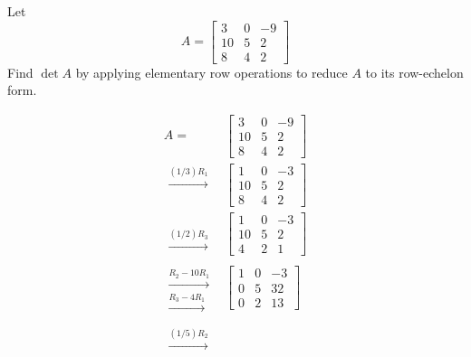 \documentclass{ximera}
\begin{document}
\begin{example}\label{ex:detandelemrowops2}
Let $$A=\begin{bmatrix}3&0&-9\\10&5&2\\8&4&2 \end{bmatrix}$$
Find $\det{A}$ by applying elementary row operations to reduce $A$ to its row-echelon form.

\begin{explanation}
\begin{align}A=&\left[\begin{array}{ccc}  
 3&0&-9\\10&5&2\\8&4&2
 \end{array}\right]\nonumber\\
 \begin{array}{c}
 \xrightarrow{(1/3)R_1}\\
 \\
\\
 \end{array}
 &\left[\begin{array}{ccc}  
 1&0&-3\\10&5&2\\8&4&2
 \end{array}\right]\label{eq:refstep1}\\
 \begin{array}{c}
 \\
 \\
\xrightarrow{(1/2)R_3}
\end{array}
&\left[\begin{array}{ccc}  
 1&0&-3\\10&5&2\\4&2&1
 \end{array}\right]\label{eq:refstep2}\\
 \begin{array}{c}
 \\
 \xrightarrow{R_2-10R_1}\\
\xrightarrow{R_3-4R_1}
\end{array}&\left[\begin{array}{ccc}  
 1&0&-3\\0&5&32\\0&2&13
 \end{array}\right]\label{eq:refstep3}\\
 \begin{array}{c}
 \\
 \xrightarrow{(1/5)R_2}\\

\end{array}
\end{align}
\end{explanation}
\end{example}
\end{document}
